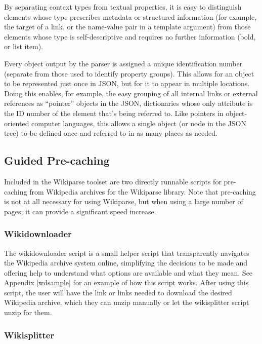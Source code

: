 By separating context types from textual properties, it is easy to distinguish elements whose type prescribes metadata or structured information (for example, the target of a link, or the name-value pair in a template argument) from those elements whose type is self-descriptive and requires no further information (bold, or list item).

Every object output by the parser is assigned a unique identification number (separate from those used to identify property groups). This allows for an object to be represented just once in JSON, but for it to appear in multiple locations. Doing this enables, for example, the easy grouping of all internal links or external references as ``pointer'' objects in the JSON, dictionaries whose only attribute is the ID number of the element that's being referred to. Like pointers in object-oriented computer languages, this allows a single object (or node in the JSON tree) to be defined once and referred to in as many places as needed.

\subsection{Guided Pre-caching}

Included in the Wikiparse toolset are two directly runnable scripts for pre-caching from Wikipedia archives for the Wikiparse library. Note that pre-caching is not at all necessary for using Wikiparse, but when using a large number of pages, it can provide a significant speed increase.

\subsubsection*{Wikidownloader}

The wikidownloader script is a small helper script that transparently navigates the Wikipedia archive system online, simplifying the decisions to be made and offering help to understand what options are available and what they mean. See Appendix \ref{wdsample} for an example of how this script works. After using this script, the user will have the link or links needed to download the desired Wikipedia archive, which they can unzip manually or let the wikisplitter script unzip for them.

\subsubsection*{Wikisplitter}

